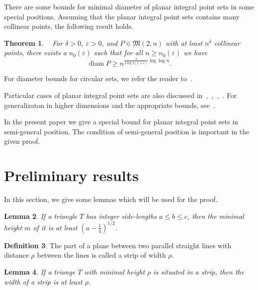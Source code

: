 \documentclass[a4paper,14pt]{article} %
\theoremstyle{plain}
\newtheorem{theorem}{Theorem}[section]
\newtheorem{lemma}[theorem]{Lemma}
\theoremstyle{definition}
\newtheorem{definition}[theorem]{Definition}
\begin{document}
There are some bounds for minimal diameter of planar integral point sets in some special positions.
Assuming that the planar integral point sets contains many collinear points,
the following result holds.
\begin{theorem}~\cite[Theorem 4]{kurz2008minimum}
	For $\delta > 0$, $\varepsilon > 0$, and $P\in\mathfrak{M}(2,n)$ with
	at least $n^\delta$ collinear points, there exists a $n_0 (\varepsilon)$
	such that for all $n \geq n_0 (\varepsilon)$ we have
	\begin{equation}
		\operatorname{diam} P \geq n^{\frac{\delta}{4 \log 2(1+\varepsilon)}\log \log n}
		.
	\end{equation}
\end{theorem}
For diameter bounds for circular sets, we refer the reader to~\cite{bat2018number}.

Particular cases of planar integral point sets are also discussed
in~\cite[\S 5.11]{brass2006research},~\cite[\S D20]{guy2013unsolved},~\cite{our-pmm-2018},~\cite{our-ped-2018}.
For generalizaton in higher dimensions and the appropriate bounds, see~\cite{kurz2005characteristic,nozaki2013lower}.

In the present paper we give a special bound for planar integral point sets in semi-general position.
The condition of semi-general position is important in the given proof.



\section{Preliminary results}

In this section, we give some lemmas which will be used for the proof.


\begin{lemma}
	\cite[Observation 1]{solymosi2003note}
	If a triangle $T$ has integer side-lengths $a \leq b \leq c$,
	then the minimal height $m$ of it is at least $\left(a - \frac{1}{4}\right)^{1/2}$.
\end{lemma}

\begin{definition}
	The part of a plane between two parallel straight lines with distance $\rho$ between the lines
	is called a strip of width $\rho$.
\end{definition}

\begin{lemma}
	\cite{smurov1998stripcoverings}
	If a triange $T$ with minimal height $\rho$ is situated in a strip,
	then the width of a strip is at least $\rho$.
\end{lemma}
\end{document}
